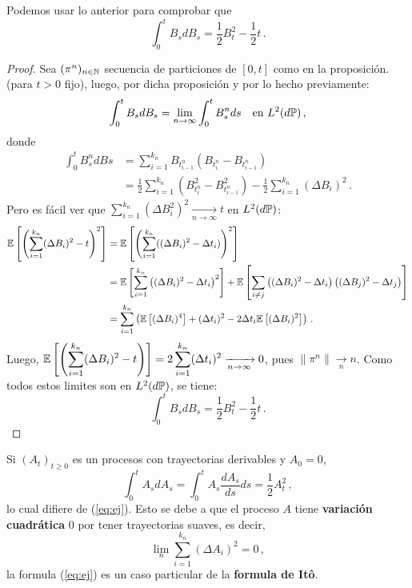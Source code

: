 \begin{example}
Podemos usar lo anterior para comprobar que 
$$\int_{0}^{t} B_s dB_s = \frac{1}{2} B_t^2 - \frac{1}{2}t \,.$$
\end{example}
\begin{proof}
\gris
Sea $(\pi^{n})_{n \in \N}$ secuencia de particiones de $[0,t]$ como en la proposición. (para $t >0$ fijo), luego, por dicha proposición y por lo hecho previamente:
\begin{equation*}
    \int_{0}^{t} B_s dB_s = \lim_{n \to \infty} \int_{0}^{t} B_s^n ds ~ ~ ~ \text{en } L^{2}(d\P)\,,
\end{equation*}
donde 
\begin{align*}
    \int_{0}^{t} B_s^n dBs 
    &= \sum_{i=1}^{k_n} B_{t_{i-1}^n}(B_{t_{i}^n} - B_{t_{i-1}^n}) \\ 
    &= \frac{1}{2} \sum_{i=1}^{k_n} (B_{t_{i}^n}^2 - B_{t_{i-1}^n}^2) -
    \frac{1}{2} \sum_{i=1}^{k_n} (\Delta B_i)^2\,.
\end{align*}
Pero es fácil ver que $\displaystyle\sum_{i=1}^{k_n} (\Delta B_i^2)^2 \xrightarrow[n \to \infty]{} t$ en 
$L^2(d\P)$: 
\begin{align*}
    \E \left[ \left( \sum_{i=1}^{k_n} (\Delta B_i)^2 - t \right)^2 \right]
    & = \E \left[ \left( \sum_{i=1}^{k_n} ((\Delta B_i)^2 - \Delta t_i)  \right)^2 \right] \\
    &= \E \left[ \sum_{i=1}^{k_n} \left( (\Delta B_i)^2 - \Delta t_i  \right)^2 \right] + \E \left[ \sum_{i \neq j} \left( (\Delta B_i)^2 - \Delta t_i \right) \left( (\Delta B_j)^2 - \Delta t_j \right) \right] \\
    &= \sum_{i=1}^{k_n} \left( \E \left[ (\Delta B_i)^4 \right] + (\Delta t_i)^2 -2\Delta t_i \E \left[ (\Delta B_i)^2 \right] \right)\,.
\end{align*}
Luego, $\displaystyle \E \left[ \left( \sum_{i=1}^{k_n} (\Delta B_i )^2 - t \right)  \right] = 2 \sum_{i=1}^{k_n} (\Delta t_i)^2 \xrightarrow[n \to \infty]{} 0$, pues $\|\pi^n\| \xrightarrow[n]{} n$. Como todos estos limites son en $L^2(d\P)$, se tiene:
\begin{equation*}
    \label{eq:ej}
    \tag{*}
    \int_{0}^{t} B_s dB_s = \frac{1}{2} B_t^2 - \frac{1}{2}t \,.
\end{equation*}
\findem
\negro
\end{proof}

\begin{remark}
Si $(A_t)_{t \ge 0}$ es un procesos con trayectorias derivables y $A_0 = 0$, 
\begin{equation*}
    \int_{0}^{t} A_s dA_s = \int_{0}^{t} A_s \frac{dA_s}{ds} ds = \frac{1}{2} A^2_t\,,
\end{equation*}
lo cual difiere de (\ref{eq:ej}). Esto se debe a que el proceso $A$ tiene \textbf{variación cuadrática} $0$ por tener trayectorias suaves, es decir, 
\begin{equation*}
    \lim_{n} \sum_{i=1}^{k_n} (\Delta A_i)^2 = 0\,,
\end{equation*}
la formula (\ref{eq:ej}) es un caso particular de la \textbf{formula de It\^{o}}.
\end{remark}

